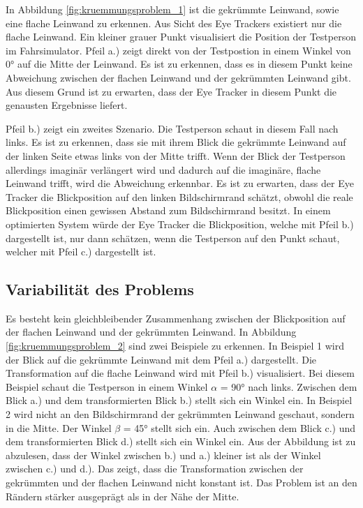 In Abbildung \ref{fig:kruemmungsproblem_1} ist die gekrümmte Leinwand, sowie eine flache Leinwand zu erkennen. Aus Sicht des Eye Trackers existiert nur die flache Leinwand. Ein kleiner grauer Punkt visualisiert die Position der Testperson im Fahrsimulator. Pfeil a.) zeigt direkt von der Testpostion in einem Winkel von 0° auf die Mitte der Leinwand. Es ist zu erkennen, dass es in diesem Punkt keine Abweichung zwischen der flachen Leinwand und der gekrümmten Leinwand gibt. Aus diesem Grund ist zu erwarten, dass der Eye Tracker in diesem Punkt die genausten Ergebnisse liefert. 

Pfeil b.) zeigt ein zweites Szenario. Die Testperson schaut in diesem Fall nach links. Es ist zu erkennen, dass sie mit ihrem Blick die gekrümmte Leinwand auf der linken Seite etwas links von der Mitte trifft. Wenn der Blick der Testperson allerdings imaginär verlängert wird und dadurch auf die imaginäre, flache Leinwand trifft, wird die Abweichung erkennbar. Es ist zu erwarten, dass der Eye Tracker die Blickposition auf den linken Bildschirmrand schätzt, obwohl die reale Blickposition einen gewissen Abstand zum Bildschirmrand besitzt. In einem optimierten System würde der Eye Tracker die Blickposition, welche mit Pfeil b.) dargestellt ist, nur dann schätzen, wenn die Testperson auf den Punkt schaut, welcher mit Pfeil c.) dargestellt ist.


\subsection{Variabilität des Problems}

Es besteht kein gleichbleibender Zusammenhang zwischen der Blickposition auf der flachen Leinwand und der gekrümmten Leinwand. In Abbildung \ref{fig:kruemmungsproblem_2} sind zwei Beispiele zu erkennen. In Beispiel 1 wird der Blick auf die gekrümmte Leinwand mit dem Pfeil a.) dargestellt. Die Transformation auf die flache Leinwand wird mit Pfeil b.) visualisiert. Bei diesem Beispiel schaut die Testperson in einem Winkel $\alpha$ = 90° nach links. Zwischen dem Blick a.) und dem transformierten Blick b.) stellt sich ein Winkel ein. In Beispiel 2 wird nicht an den Bildschirmrand der gekrümmten Leinwand geschaut, sondern in die Mitte. Der Winkel $\beta$ = 45° stellt sich ein. Auch zwischen dem Blick c.) und dem transformierten Blick d.) stellt sich ein Winkel ein. Aus der Abbildung ist zu abzulesen, dass der Winkel zwischen b.) und a.) kleiner ist als der Winkel zwischen c.) und d.). Das zeigt, dass die Transformation zwischen der gekrümmten und der flachen Leinwand nicht konstant ist. Das Problem ist an den Rändern stärker ausgeprägt als in der Nähe der Mitte.


